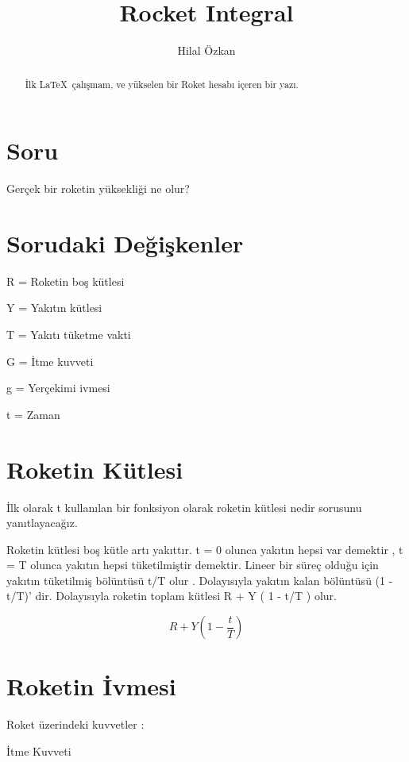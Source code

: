 \documentclass[a4paper,10pt]{article}
\title{Rocket Integral}
\author{Hilal Özkan}
\begin{document}
\maketitle

\begin{abstract}

İlk \LaTeX \, çalışmam, ve yükselen bir Roket hesabı içeren bir yazı.

\end{abstract}


 \section{Soru} 
 
 
 Gerçek bir roketin yüksekliği ne olur?

\section{Sorudaki Değişkenler}



 R = Roketin boş kütlesi

 Y = Yakıtın kütlesi

 T = Yakıtı tüketme vakti

 G = İtme kuvveti

 g = Yerçekimi ivmesi

 t = Zaman

\section{Roketin Kütlesi}

İlk olarak t kullanılan bir fonksiyon olarak roketin kütlesi nedir sorusunu yanıtlayacağız.


Roketin kütlesi boş kütle artı yakıttır. t = 0 olunca yakıtın hepsi var demektir , t  = T olunca yakıtın hepsi tüketilmiştir demektir. Lineer bir süreç olduğu için yakıtın tüketilmiş bölüntüsü t/T olur . Dolayısıyla yakıtın kalan bölüntüsü  (1 - t/T)' dir.  Dolayısıyla roketin toplam kütlesi R + Y ( 1 - t/T ) olur.

\[ R + Y ( 1 - \frac{t}{T} )\]

\section{Roketin İvmesi}

Roket üzerindeki kuvvetler : 

İtme Kuvveti 
\end{document}
